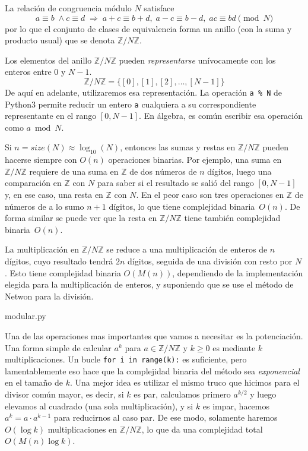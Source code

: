 \documentclass[a4paper, 11pt]{article}
\newcommand{\ZZ}{\mathbb{Z}}
\theoremstyle{plain}
\theoremstyle{definition}
\begin{document}
\bigskip

La relación de congruencia módulo $N$ satisface
\[
a\equiv b\;\wedge c\equiv d\;\Longrightarrow\;
a+c\equiv b+d,\; a-c\equiv b-d,\; ac\equiv bd\pmod{N}
\]
por lo que el conjunto de clases de equivalencia forma un anillo (con la suma
y producto usual) que se denota $\ZZ/N\ZZ$. 

\bigskip

Los elementos del anillo $\ZZ/N\ZZ$ pueden \emph{representarse} unívocamente
con los enteros entre $0$ y $N-1$.
\[
\ZZ/N\ZZ=\big\{ [0], [1], [2],\ldots,[N-1] \big\}
\]
De aquí en adelante, utilizaremos esa representación. La operación
\texttt{a \% N} de Python3 permite reducir un entero \texttt{a} cualquiera
a su correspondiente representante en el rango $[0,N-1]$. En álgebra,
es común escribir esa operación como $a\bmod N$.

\bigskip

Si $n=size(N)\approx\log_{10}(N)$, entonces las sumas y restas en $\ZZ/N\ZZ$
pueden hacerse siempre con $O(n)$ operaciones binarias. Por ejemplo, una suma
en $\ZZ/N\ZZ$ requiere de una suma en $\ZZ$ de dos números de $n$ dígitos,
luego una comparación en $\ZZ$ con $N$ para saber si el resultado se salió del
rango $[0,N-1]$ y, en ese caso, una resta en $\ZZ$ con $N$. En el peor caso son
tres operaciones en $\ZZ$ de números de a lo sumo $n+1$ dígitos, lo que tiene
complejidad binaria~$O(n)$. De forma similar se puede ver que la resta en
$\ZZ/N\ZZ$ tiene también complejidad binaria~$O(n)$.

\bigskip

La multiplicación en $\ZZ/N\ZZ$ se reduce a una multiplicación de enteros
de $n$ dígitos, cuyo resultado tendrá $2n$ dígitos, seguida de una división
con resto por $N$. Esto tiene complejidad binaria $O(M(n))$, dependiendo de
la implementación elegida para la multiplicación de enteros, y suponiendo
que se use el método de Netwon para la división.

\bigskip


{modular.py}

\bigskip

Una de las operaciones mas importantes que vamos a necesitar es la
potenciación. Una forma simple de calcular $a^k$ para $a\in\ZZ/N\ZZ$ y
$k\geq 0$ es mediante $k$ multiplicaciones. Un bucle \texttt{for i in range(k):}
es suficiente, pero lamentablemente eso hace que la complejidad binaria del
método sea \textit{exponencial} en el tamaño de $k$. Una mejor idea es
utilizar el mismo truco que hicimos para el divisor común mayor, es decir,
si $k$ es par, calculamos primero $a^{k/2}$ y luego elevamos al cuadrado (una
sola multiplicación), y si $k$ es impar, hacemos $a^k=a\cdot a^{k-1}$ para
reducirnos al caso par. De ese modo, solamente haremos $O(\log k)$ multiplicaciones
en $\ZZ/N\ZZ$, lo que da una complejidad total $O(M(n)\log k)$.
\end{document}
